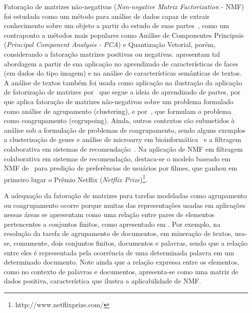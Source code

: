 \documentclass[
    12pt,                %
    oneside,            %
    a4paper,            %
    english,            %
    brazil                %
    ]{abntex2ppgsi}
\begin{document}
Fatoração de matrizes não-negativas (\textit{Non-negative Matrix Factorization} - NMF) foi estudada como um método para análise de dados capaz de extrair conhecimento sobre um objeto a partir do estudo de suas partes~\cite{lee99}, como um contraponto a métodos mais populares como Análise de Componentes Principais (\textit{Principal Component Analysis - PCA}) e Quantização Vetorial, porém, considerando a fatoração matrizes positivas ou negativas.
 apresentam tal abordagem a partir de sua aplicação no aprendizado de características de faces (em dados do tipo imagem) e na análise de características semânticas de textos.
A análise de textos também foi usada como aplicação na ilustração da aplicação de fatorização de matrizes por~ que segue a ideia de aprendizado de partes, por~ que aplica fatoração de matrizes não-negativas sobre um problema formulado como análise de agrupamento (clustering), e por~, que formulam o problema como coagrupamento (cogrupoing).
Ainda, outros contextos são submetidos à análise sob a formulação de problemas de coagrupamento, sendo alguns exemplos a clusterização de genes e análise de microarry em bioinformática~\cite{Kluger2003} e a filtragem colaborativa em sistemas de recomendação~\cite{SalMnih08}.
Na aplicação de NMF em filtragem colaborativa em sistemas de recomendação, destaca-se o modelo baseado em NMF de~ para predição de preferências de usuários por filmes, que ganhou em primeiro lugar o Prêmio Netflix (\textit{Netflix Prize})\footnote{http://www.netflixprize.com/}.

A adequação da fatoração de matrizes para tarefas modeladas como agrupamento ou coagrupamento ocorre porque muitas das representações usadas em aplicações nessas áreas se apresentam como uma relação entre pares de elementos pertencentes a conjuntos finitos, como apresentado em \cite{Long2005}. Por exemplo, na resolução da tarefa de agrupamento de documentos, em mineração de textos, usa-se, comumente, dois conjuntos finitos, documentos e palavras, sendo que a relação entre eles é representada pela ocorrência de uma determinada palavra em um determinado documento. Note ainda que a relação expressa entre os elementos, como no contexto de palavras e documentos, apresenta-se como uma matriz de dados positiva, característica que ilustra a aplicabilidade de NMF.
\end{document}
